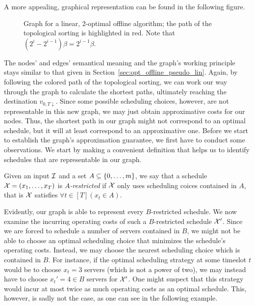 A more appealing, graphical representation can be found in the following figure.
\begin{figure}[H]

\caption{Graph for a linear, 2-optimal offline algorithm; the path of the topological sorting is highlighted in red. Note that $(2^i-2^{i-1})\beta =2^{i-1}\beta$.}
\label{fig:graph_lin_approx_2}
\end{figure}
The nodes' and edges' semantical meaning and the graph's working principle stays similar to that given in Section~\ref{sec:opt_offline_pseudo_lin}. Again, by following the colored path of the topological sorting, we can work our way through the graph to calculate the shortest paths, ultimately reaching the destination $v_{0,T\downarrow}$. Since some possible scheduling choices, however, are not representable in this new graph, we may just obtain approximative costs for our nodes. Thus, the shortest path in our graph might not correspond to an optimal schedule, but it will at least correspond to an approximative one. Before we start to establish the graph's approximation guarantee, we first have to conduct some observations. We start by making a convenient definition that helps us to identify schedules that are representable in our graph.
\begin{defn}
Given an input $\mathcal{I}$ and a set $A\subseteq\{0,\dotsc,m\}$, we say that a schedule $\mathcal{X}=(x_1,\dotsc,x_T)$ is \emph{$A$-restricted} if $\mathcal{X}$ only uses scheduling coices contained in $A$, that is $\mathcal{X}$ satisfies $\forall t\in[T](x_t\in A)$.
\end{defn}
Evidently, our graph is able to represent every $B$-restricted schedule. We now examine the incurring operating costs of such a $B$-restricted schedule $\mathcal{X}'$. Since we are forced to schedule a number of servers contained in $B$, we might not be able to choose an optimal scheduling choice that minimizes the schedule's operating costs. Instead, we may choose the nearest scheduling choice which is contained in $B$. For instance, if the optimal scheduling strategy at some timeslot $t$ would be to choose $x_t=3$ servers (which is not a power of two), we may instead have to choose $x_t'=4\in B$ servers for $\mathcal{X}'$. One might suspect that this strategy would incur at most twice as much operating costs as an optimal schedule. This, however, is sadly not the case, as one can see in the following example.

